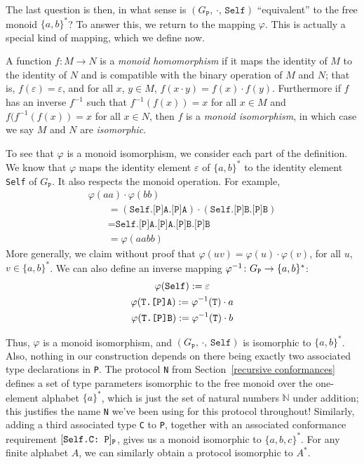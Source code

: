 \documentclass[../generics]{subfiles}
\begin{document}
The last question is then, in what sense is $(G_\texttt{P},\,\cdot,\,\texttt{Self})$ ``equivalent'' to the free monoid $\{a,b\}^*$? To answer this, we return to the mapping $\varphi$. This is actually a special kind of mapping, which we define now.

\begin{definition}
%
%
%
%
A function $f\colon M\rightarrow N$ is a \emph{monoid homomorphism} if it maps the identity of $M$ to the identity of $N$ and is compatible with the binary operation of $M$ and $N$; that is, $f(\varepsilon)=\varepsilon$, and for all $x$, $y\in M$, $f(x\cdot y)=f(x)\cdot f(y)$. Furthermore if $f$ has an inverse $f^{-1}$ such that $f^{-1}(f(x))=x$ for all $x\in M$ and $f(f^{-1}(f(x))=x$ for all $x\in N$, then $f$ is a \emph{monoid isomorphism}, in which case we say $M$ and $N$ are \emph{isomorphic}.
\end{definition}

To see that $\varphi$ is a monoid isomorphism, we consider each part of the definition. We know that $\varphi$ maps the identity element $\varepsilon$ of $\{a,b\}^*$ to the identity element \texttt{Self} of $G_\texttt{P}$. It also respects the monoid operation. For example,
\begin{gather*}
\varphi(aa)\cdot\varphi(bb)\\
\qquad {}=(\texttt{Self.[P]A.[P]A})\cdot(\texttt{Self.[P]B.[P]B})\\
\qquad {}=\texttt{Self.[P]A.[P]A.[P]B.[P]B}\\
\qquad {}=\varphi(aabb)
\end{gather*}
More generally, we claim without proof that $\varphi(uv)=\varphi(u)\cdot\varphi(v)$, for all $u$, $v\in\{a,b\}^*$. We can also define an inverse mapping $\varphi^{-1}\colon G_\texttt{P}\rightarrow\{a,b\}^*$:
\begin{gather*}
\varphi(\texttt{Self}):=\varepsilon\\
\varphi(\texttt{\texttt{T}.[P]A}):=\varphi^{-1}(\texttt{T})\cdot a\\
\varphi(\texttt{\texttt{T}.[P]B}):=\varphi^{-1}(\texttt{T})\cdot b
\end{gather*}

Thus, $\varphi$ is a monoid isomorphism, and $(G_\texttt{P},\,\cdot,\,\texttt{Self})$ is isomorphic to $\{a,b\}^*$. Also, nothing in our construction depends on there being exactly two associated type declarations in \texttt{P}. The protocol \texttt{N} from Section~\ref{recursive conformances} defines a set of type parameters isomorphic to the free monoid over the one-element alphabet $\{a\}^*$, which is just the set of natural numbers $\mathbb{N}$ under addition; this justifies the name \texttt{N} we've been using for this protocol throughout! Similarly, adding a third associated type \texttt{C} to \texttt{P}, together with an associated conformance requirement $[\texttt{Self.C:~P}]_\texttt{P}$, gives us a monoid isomorphic to $\{a,b,c\}^*$. For any finite alphabet $A$, we can similarly obtain a protocol isomorphic to $A^*$.
\end{document}
